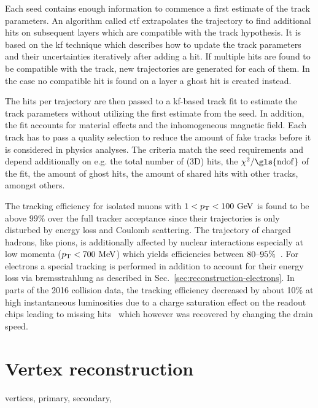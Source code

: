 Each seed contains enough information to commence a first estimate of the track parameters. An algorithm called \gls{ctf} extrapolates the trajectory to find additional hits on subsequent layers which are compatible with the track hypothesis. It is based on the \gls{kf} technique which describes how to update the track parameters and their uncertainties iteratively after adding a hit. If multiple hits are found to be compatible with the track, new trajectories are generated for each of them. In the case no compatible hit is found on a layer a ghost hit is created instead.

The hits per trajectory are then passed to a \gls{kf}-based track fit to estimate the track parameters without utilizing the first estimate from the seed. In addition, the fit accounts for material effects and the inhomogeneous magnetic field.  Each track has to pass a quality selection to reduce the amount of fake tracks before it is considered in physics analyses. The criteria match the seed requirements and depend additionally on e.g. the total number of (3D) hits, the $\chi^2/\mathrm{\gls{ndof}}$ of the fit, the amount of ghost hits, the amount of shared hits with other tracks, amongst others.

The tracking efficiency for isolated muons with $1<p_\mathrm{T}<100~\mathrm{GeV}$ is found to be above $99\%$ over the full tracker acceptance since their trajectories is only disturbed by energy loss and Coulomb scattering. The trajectory of charged hadrons, like pions, is additionally affected by nuclear interactions especially at low momenta ($p_\mathrm{T}<700~\mathrm{MeV}$) which yields efficiencies between $80\text{--}95\%$~\cite{Chatrchyan:2014fea}. For electrons a special tracking is performed in addition to account for their energy loss via bremsstrahlung as described in Sec.~\ref{sec:reconstruction-electrons}. In parts of the 2016 collision data, the tracking efficiency decreased by about 10\% at high instantaneous luminosities due to a charge saturation effect on the readout chips leading to missing hits~\cite{CMS-DP-2016-043} which however was recovered by changing the drain speed.


\section{Vertex reconstruction}


vertices, primary, secondary, 




